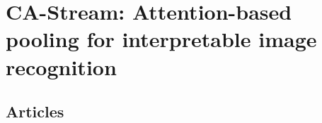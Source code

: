 \chapter{CA-Stream: Attention-based pooling for interpretable image recognition}
\chaptertoc{}


\section{Articles}
    \fullcite{}
